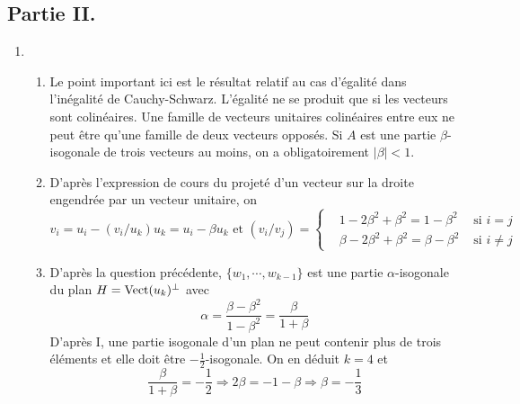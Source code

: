 \subsection*{Partie II.}
\begin{enumerate}
 \item
\begin{enumerate}
 \item Le point important ici est le résultat relatif au cas d'égalité dans l'inégalité de Cauchy-Schwarz. L'égalité ne se produit que si les vecteurs sont colinéaires. Une famille de vecteurs unitaires colinéaires entre eux ne peut être qu'une famille de deux vecteurs opposés. Si $A$ est une partie $\beta$-isogonale de trois vecteurs au moins, on a obligatoirement $\vert\beta\vert<1$.  
 \item D'après l'expression de cours du projeté d'un vecteur sur la droite engendrée par un vecteur unitaire, on 
\begin{displaymath}
 v_i = u_i -(v_i/u_k)u_k =u_i-\beta u_k\text{ et }
(v_i/v_j)=
\left\lbrace
\begin{aligned}
 &1-2\beta^2+\beta^2=1-\beta^2&\text{ si } i=j\\
 &\beta -2\beta^2+\beta^2=\beta-\beta^2&\text{ si } i\neq j
\end{aligned}
\right. 
\end{displaymath}

 \item D'après la question précédente, $\{w_1,\cdots,w_{k-1}\}$ est une partie $\alpha$-isogonale du plan $H=\operatorname{Vect}(u_k)^\perp$ avec
\begin{displaymath}
 \alpha = \frac{\beta-\beta^2}{1-\beta^2}=\frac{\beta}{1+\beta}
\end{displaymath}
D'après I, une partie isogonale d'un plan ne peut contenir plus de trois éléments et elle doit être $-\frac{1}{2}$-isogonale. On en déduit $k=4$ et
\begin{displaymath}
 \frac{\beta}{1+\beta}= -\frac{1}{2} \Rightarrow 2\beta = -1-\beta
\Rightarrow \beta = -\frac{1}{3}
\end{displaymath}
\end{enumerate}
 

\end{enumerate}
